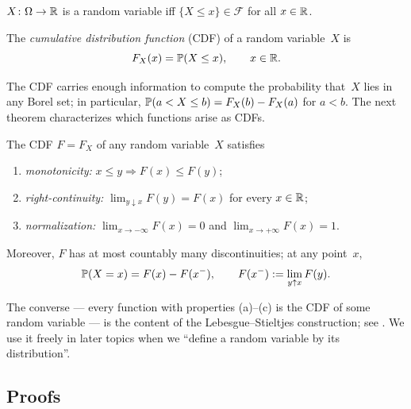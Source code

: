 \begin{lemma}
\label{lem:rv-equiv-criterion}
$X \colon \Omega \to \mathbb{R}$ is a random variable iff
$\{X \leq x\} \in \mathcal{F}$ for all $x \in \mathbb{R}$.
\end{lemma}

\begin{definition}
\label{def:cdf}
The \emph{cumulative distribution function} (CDF) of a random
variable~$X$ is
\[
  F_X(x) = \mathbb{P}(X \leq x), \qquad x \in \mathbb{R}.
\]
\end{definition}

The CDF carries enough information to compute the probability that~$X$
lies in any Borel set; in particular,
$\mathbb{P}(a < X \leq b) = F_X(b) - F_X(a)$ for $a < b$. The next theorem
characterizes which functions arise as CDFs.

\begin{theorem}
\label{thm:cdf-properties}
The CDF $F = F_X$ of any random variable~$X$ satisfies
\begin{enumerate}[label=(\alph*)]
  \item \emph{monotonicity:} $x \leq y \Rightarrow F(x) \leq F(y)$;
  \item \emph{right-continuity:} $\lim_{y \downarrow x} F(y) = F(x)$ for every $x \in \mathbb{R}$;
  \item \emph{normalization:} $\lim_{x \to -\infty} F(x) = 0$ and $\lim_{x \to +\infty} F(x) = 1$.
\end{enumerate}
Moreover, $F$ has at most countably many discontinuities; at any
point~$x$,
\[
  \mathbb{P}(X = x) = F(x) - F(x^{-}), \qquad F(x^{-}) := \lim_{y \uparrow x} F(y).
\]
\end{theorem}

\begin{remark}
The converse — every function with properties (a)–(c) is the CDF of
some random variable — is the content of the Lebesgue–Stieltjes
construction; see \cite[Ch.~II, \S 3]{Shiryaev1989}. We use it freely
in later topics when we ``define a random variable by its
distribution''.
\end{remark}

\subsection*{Proofs}

